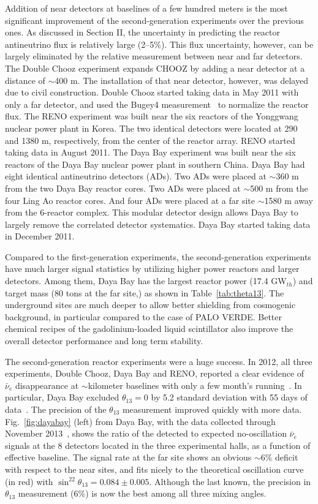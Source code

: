 \documentclass[aps,twocolumn,preprintnumbers,amsmath,superscriptaddress,amssymb,floats,nofootinbib]{revtex4-1}
\begin{document}
Addition of near detectors at baselines of a few hundred meters is the most significant improvement of the second-generation experiments over the previous ones.
As discussed in Section II, the uncertainty in predicting the reactor antineutrino flux is relatively large (2--5\%). 
This flux uncertainty, however, can be largely eliminated by the relative measurement between near and far detectors. 
The Double Chooz experiment expands CHOOZ by adding a near detector at a distance of $\sim$400 m. 
The installation of that near detector, however, was delayed due to civil construction. 
Double Chooz started taking data in May 2011 with only a far detector, and used the Bugey4 measurement~\cite{Bugey4} to normalize the reactor flux. 
The RENO experiment was built near the six reactors of the Yonggwang nuclear power plant in Korea. 
The two identical detectors were located at 290 and 1380 m, respectively, from the center of the reactor array. 
RENO started taking data in August 2011. 
The Daya Bay experiment was built near the six reactors of the Daya Bay nuclear power plant in southern China. 
Daya Bay had eight identical antineutrino detectors (ADs). 
Two ADs were placed at $\sim$360 m from the two  Daya Bay reactor cores. 
Two ADs were placed at $\sim$500 m from the four Ling Ao reactor cores. 
And four ADs were placed at a far site $\sim$1580 m away from the 6-reactor complex. 
This modular detector design allows Daya Bay to largely remove the correlated detector systematics. 
Daya Bay started taking data in December 2011.

Compared to the first-generation experiments, the second-generation experiments have much larger signal statistics by utilizing higher power reactors and larger detectors. Among them, Daya Bay has the largest reactor power (17.4 GW$_{th}$) and target mass (80 tons at the far site,) as shown in Table~\ref{tab:theta13}. 
The underground sites are much deeper to allow better shielding from cosmogenic background, in particular compared to the case of PALO VERDE. 
Better chemical recipes of the gadolinium-loaded liquid scintillator also improve the overall detector performance and long term stability.

The second-generation reactor experiments were a huge success. 
In 2012, all three experiments, Double Chooz, Daya Bay and RENO, reported 
a clear evidence of $\bar\nu_{e}$ disappearance at $\sim$kilometer baselines with only a few month's running~\cite{DChooz,Reno,Dayabay}. 
In particular, Daya Bay excluded $\theta_{13}=0$ by 5.2 standard deviation with 55 days of data~\cite{Dayabay}. 
The precision of the $\theta_{13}$ measurement improved quickly with more data.
Fig.~\ref{fig:dayabay} (left) from Daya Bay, with the data collected through November 2013~\cite{Zhang-Neutrino14}, shows the ratio of the detected to expected no-oscillation $\bar\nu_{e}$ signals at the 8 detectors located in the three experimental halls, as a function of effective baseline.
The signal rate at the far site shows an obvious
$\sim$6\% deficit with respect to the near sites, and fits nicely to the theoretical oscillation curve (in red) with $\sin^22\theta_{13} = 0.084 \pm 0.005$. 
Although the last known, the precision in $\theta_{13}$ measurement (6\%) is now the best among all three mixing angles.
\end{document}
